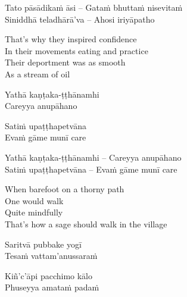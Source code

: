 \else

\begin{verses}
  Tato pāsādikaṁ āsi – Gataṁ bhuttaṁ nisevitaṁ\\
  Siniddhā teladhārā'va – Ahosi iriyāpatho
\end{verses}

\fi

\begin{english-verses}
  That's why they inspired confidence\\
  In their movements eating and practice\\
  Their deportment was as smooth\\
  As a stream of oil
\end{english-verses}

\ifbfive\clearpage\fi

\ifninebythirteen

\clearpage

\begin{pali-hang-verses}
  Yathā kaṇṭaka-ṭṭhānamhi\\
  Careyya anupāhano
\end{pali-hang-verses}
\begin{pali-hang-together}
  Satiṁ upaṭṭhapetvāna\\
  Evaṁ gāme munī care
\end{pali-hang-together}

\else

\begin{verses}
  Yathā kaṇṭaka-ṭṭhānamhi – Careyya anupāhano\\
  Satiṁ upaṭṭhapetvāna – Evaṁ gāme munī care
\end{verses}

\fi

\ifafive\clearpage\fi

\begin{english-verses}
  When barefoot on a thorny path\\
  One would walk\\
  Quite mindfully\\
  That's how a sage should walk in the village
\end{english-verses}

\ifninebythirteen

\begin{pali-hang-verses}
  Saritvā pubbake yogī\\
  Tesaṁ vattam'anussaraṁ
\end{pali-hang-verses}
\begin{pali-hang-together}
  Kiñ'c'āpi pacchimo kālo\\
  Phuseyya amataṁ padaṁ
\end{pali-hang-together}

